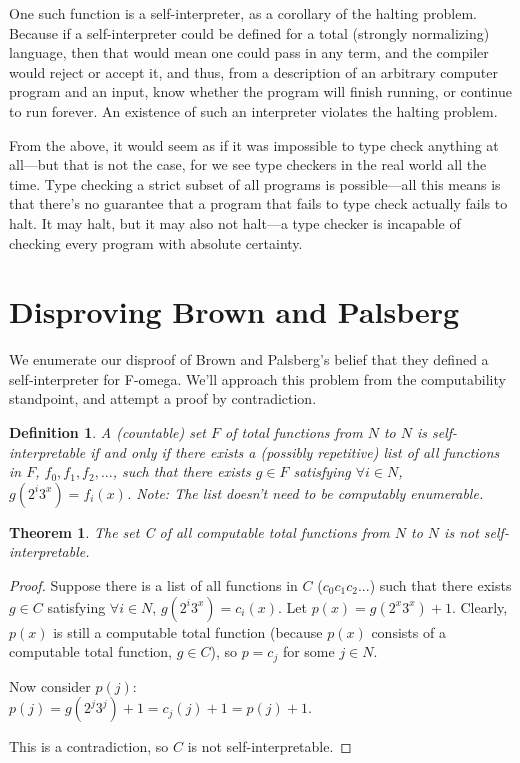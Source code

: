 \documentclass[conference]{IEEEtran}
\newtheorem{theorem}{Theorem}
\newtheorem{definition}{Definition}
\begin{document}
One such function is a self-interpreter, as a corollary of the halting problem. Because if a self-interpreter could be defined for a total (strongly normalizing) language, then that would mean one could pass in any term, and the compiler would reject or accept it, and thus, from a description of an arbitrary computer program and an input, know whether the program will finish running, or continue to run forever. An existence of such an interpreter violates the halting problem.

From the above, it would seem as if it was impossible to type check anything at all—but that is not the case, for we see type checkers in the real world all the time. Type checking a strict subset of all programs is possible—all this means is that there's no guarantee that a program that fails to type check actually fails to halt. It may halt, but it may also not halt—a type checker is incapable of checking every program with absolute certainty.

\section{Disproving Brown and Palsberg}

We enumerate our disproof of Brown and Palsberg's\cite{brown2016breaking} belief that they defined a self-interpreter for F-omega. We'll approach this problem from the computability standpoint, and attempt a proof by contradiction.

\begin{definition}
A (countable) set $F$ of total functions from $N$ to $N$ is self-interpretable if and only if there exists a (possibly repetitive) list of all functions in $F$, $f_0, f_1, f_2,  ...$, such that there exists $g \in F$ satisfying $\forall i \in N$, $g(2^i3^x) = f_i(x)$.
Note: The list doesn’t need to be computably enumerable.
\end{definition}

\begin{theorem}
The set C of all computable total functions from $N$ to $N$ is not self-interpretable.
\end{theorem}

\begin{proof}
Suppose there is a list of all functions in $C$ ($c_0  c_1  c_2  ...$) such that there exists $g \in C$ satisfying  $\forall i \in N$, $g(2^i3^x)=c_i(x)$. Let $p(x) = g(2^x3^x) + 1$. Clearly, $p(x)$ is still a computable total function (because $p(x)$ consists of a computable total function, $g \in C$), so $p = c_j$ for some $j \in N$.

Now consider $p(j)$:\\
$p(j) = g(2^j3^j) + 1 = c_j(j) + 1 = p(j) + 1$.

This is a contradiction, so $C$ is not self-interpretable.
\end{proof}
\end{document}
